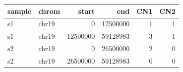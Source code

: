 \documentclass{standalone}
\begin{document}
\begin{tabular}{llrrrr}
\toprule
sample & chrom & start & end & CN1 & CN2 \\
\midrule
s1 & chr19 & 0 & 12500000 & 1 & 1 \\
s1 & chr19 & 12500000 & 59128983 & 3 & 1 \\
s2 & chr19 & 0 & 26500000 & 2 & 0 \\
s2 & chr19 & 26500000 & 59128983 & 0 & 0 \\
\bottomrule
\end{tabular}
\end{document}
